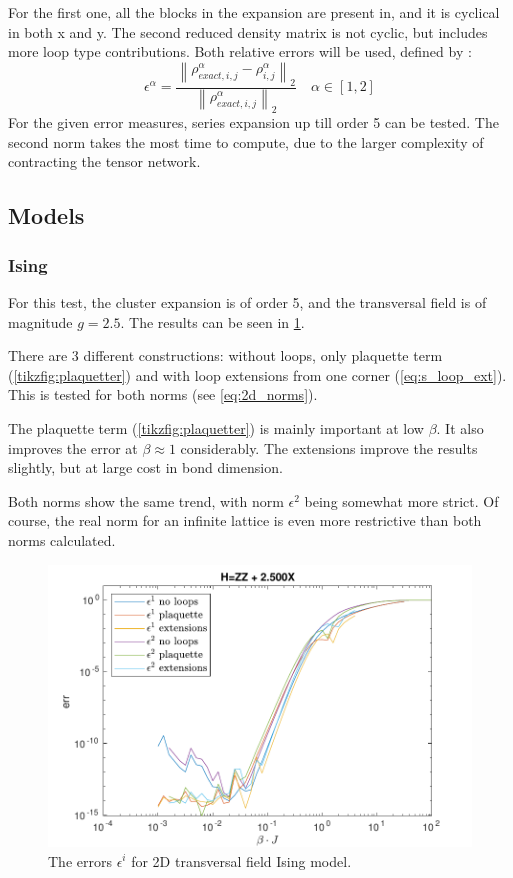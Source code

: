 For the first one, all the blocks in the expansion are present in, and it is cyclical in both x and y. The second reduced density matrix is not cyclic, but includes more loop type contributions. Both relative errors will be used, defined by :
\begin{equation}\label{eq:2d_norms}
    \epsilon^{\alpha} = \frac{  {  \left \|  \rho^{\alpha}_{exact,  i,j}- \rho^{\alpha}_{ i,j}  \right \|} _{2}  }{ {  \left\|  \rho^{\alpha}_{exact,  i,j} \right \|}_2} \quad \alpha \in [1,2]
\end{equation}
For the given error measures, series expansion up till order 5 can be tested. The second norm takes the most time to compute, due to the larger complexity of contracting the tensor network.

\subsection{Models}

\subsubsection{Ising}

For this test, the cluster expansion is of order 5, and the transversal field is of magnitude $g=2.5$. The results can be seen in \cref{fig:res2d:n1:tising}.

There are 3 different constructions: without loops, only plaquette term (\cref{tikzfig:plaquetter}) and with loop extensions from one corner (\cref{eq:s_loop_ext}). This is tested for both norms (see \cref{eq:2d_norms}).

The plaquette term (\cref{tikzfig:plaquetter}) is mainly important at low $\beta$. It also improves the error at $\beta \approx 1$ considerably. The extensions improve the results slightly, but at large cost in bond dimension.

Both norms show the same trend, with norm $\epsilon^2$ being somewhat more strict. Of course, the real norm for an infinite lattice is even more restrictive than both norms calculated.

\begin{figure}
    \center
    \includegraphics[width=\textwidth]{Figuren/benchmarking/2D_Err01_t_sing.pdf}
    \caption{The errors $\epsilon^i$ for 2D transversal field Ising model. }
    \label{fig:res2d:n1:tising}
\end{figure}

